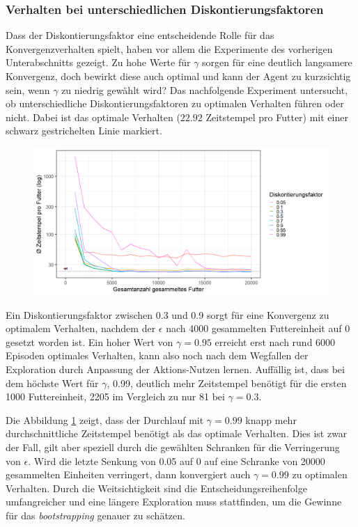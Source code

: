 \subsubsection*{Verhalten bei unterschiedlichen Diskontierungsfaktoren}
Dass der Diskontierungsfaktor eine entscheidende Rolle für das Konvergenzverhalten spielt, haben vor allem die Experimente des vorherigen Unterabschnitts gezeigt. Zu hohe Werte für $\gamma$ sorgen für eine deutlich langsamere Konvergenz, doch bewirkt diese auch optimal und kann der Agent zu \glqq kurzsichtig\grqq{} sein, wenn $\gamma$ zu niedrig gewählt wird? 
Das nachfolgende Experiment untersucht, ob unterschiedliche Diskontierungsfaktoren zu optimalen Verhalten führen oder nicht. Dabei ist das optimale Verhalten ($22.92$ Zeitstempel pro Futter) mit einer schwarz gestrichelten Linie markiert.
\begin{figure}[H]
    \centering
    \includegraphics[width=\textwidth]{images/optDisc}
    \label{fig:optDisc}
\end{figure}
Ein Diskontierungsfaktor zwischen 0.3 und 0.9 sorgt für eine Konvergenz zu optimalem Verhalten, nachdem der $\epsilon$ nach 4000 gesammelten Futtereinheit auf 0 gesetzt worden ist. Ein hoher Wert von $\gamma = 0.95$ erreicht erst nach rund 6000 Episoden optimales Verhalten, kann also noch nach dem Wegfallen der Exploration durch Anpassung der Aktions-Nutzen lernen. Auffällig ist, dass bei dem höchste Wert für $\gamma$, 0.99, deutlich mehr Zeitstempel benötigt für die ersten 1000 Futtereinheit, 2205 im Vergleich zu nur 81 bei $\gamma = 0.3$. 
\par 
Die Abbildung \ref{fig:optDisc} zeigt, dass der Durchlauf mit $\gamma = 0.99$ knapp mehr durchschnittliche Zeitstempel benötigt als das optimale Verhalten. Dies ist zwar der Fall, gilt aber speziell durch die gewählten Schranken für die Verringerung von $\epsilon$. Wird die letzte Senkung von 0.05 auf 0 auf eine Schranke von 20000 gesammelten Einheiten verringert, dann konvergiert auch $\gamma = 0.99$ zu optimalen Verhalten. Durch die \glqq Weitsichtigkeit\grqq{} sind die Entscheidungsreihenfolge umfangreicher und eine längere Exploration muss stattfinden, um die Gewinne für das \textit{bootstrapping} genauer zu schätzen.
